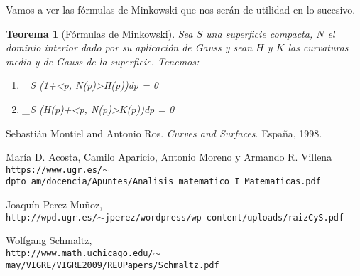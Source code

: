 \documentclass[paper=a4, fontsize=11pt, spanish]{scrartcl}
\newtheorem{theorem}{Teorema}[section]
\theoremstyle{definition}
\theoremstyle{definition}
\theoremstyle{definition}
\begin{document}
Vamos a ver las fórmulas de Minkowski que nos serán de utilidad en lo sucesivo.
\begin{theorem}[Fórmulas de Minkowski]
Sea $S$ una superficie compacta, $N$ el dominio interior dado por su aplicación de Gauss y sean $H$ y $K$ las curvaturas media y de Gauss de la superficie. Tenemos:

\begin{enumerate}
    \item \int_S (1+<p, N(p)>H(p))dp = 0
    \item \int_S (H(p)+<p, N(p)>K(p))dp = 0
\end{enumerate}
\end{theorem}





\newpage

\begin{thebibliography}{9}
Sebastián Montiel and Antonio Ros.
\textit{Curves and Surfaces}.
España, 1998.

María D. Acosta, Camilo Aparicio, Antonio Moreno y Armando R. Villena
\\\texttt{https://www.ugr.es/$\sim$dpto\_am/docencia/Apuntes/Analisis\_matematico\_I\_Matematicas.pdf}

Joaquín Perez Muñoz,
\\\texttt{http://wpd.ugr.es/$\sim$jperez/wordpress/wp-content/uploads/raizCyS.pdf}

Wolfgang Schmaltz,
\\\texttt{http://www.math.uchicago.edu/$\sim$may/VIGRE/VIGRE2009/REUPapers/Schmaltz.pdf}
\end{thebibliography}
\end{document}
